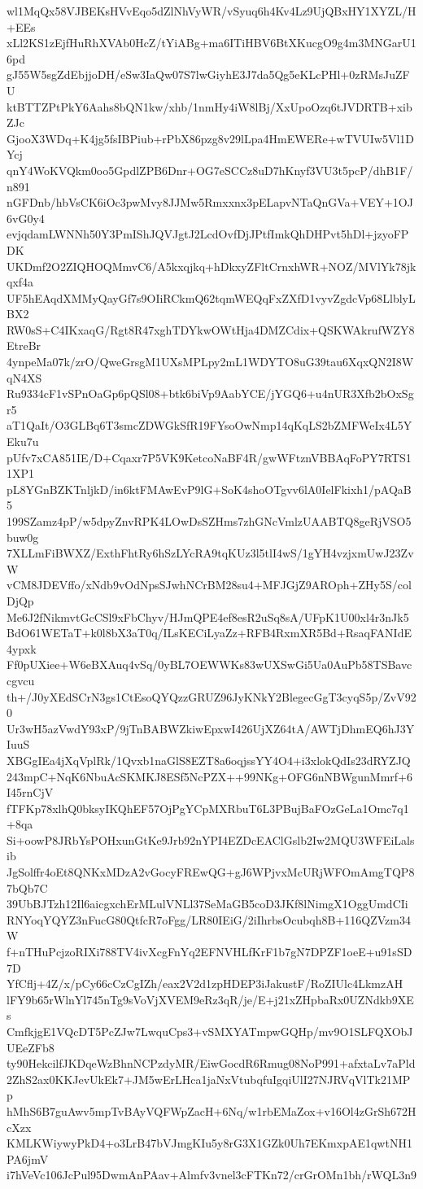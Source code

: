 wl1MqQx58VJBEKsHVvEqo5dZlNhVyWR/vSyuq6h4Kv4Lz9UjQBxHY1XYZL/H+EEs
xLl2KS1zEjfHuRhXVAb0HcZ/tYiABg+ma6ITiHBV6BtXKucgO9g4m3MNGarU16pd
gJ55W5sgZdEbjjoDH/eSw3IaQw07S7lwGiyhE3J7da5Qg5eKLcPHl+0zRMsJuZFU
ktBTTZPtPkY6Aahs8bQN1kw/xhb/1nmHy4iW8lBj/XxUpoOzq6tJVDRTB+xibZJc
GjooX3WDq+K4jg5fsIBPiub+rPbX86pzg8v29lLpa4HmEWERe+wTVUIw5Vl1DYcj
qnY4WoKVQkm0oo5GpdlZPB6Dnr+OG7eSCCz8uD7hKnyf3VU3t5pcP/dhB1F/n891
nGFDnb/hbVsCK6iOc3pwMvy8JJMw5Rmxxnx3pELapvNTaQnGVa+VEY+1OJ6vG0y4
evjqdamLWNNh50Y3PmIShJQVJgtJ2LcdOvfDjJPtfImkQhDHPvt5hDl+jzyoFPDK
UKDmf2O2ZIQHOQMmvC6/A5kxqjkq+hDkxyZFltCrnxhWR+NOZ/MVlYk78jkqxf4a
UF5hEAqdXMMyQayGf7s9OIiRCkmQ62tqmWEQqFxZXfD1vyvZgdcVp68LlblyLBX2
RW0sS+C4IKxaqG/Rgt8R47xghTDYkwOWtHja4DMZCdix+QSKWAkrufWZY8EtreBr
4ynpeMa07k/zrO/QweGrsgM1UXsMPLpy2mL1WDYTO8uG39tau6XqxQN2I8WqN4XS
Ru9334cF1vSPnOaGp6pQSl08+btk6biVp9AabYCE/jYGQ6+u4nUR3Xfb2bOxSgr5
aT1QaIt/O3GLBq6T3smcZDWGkSfR19FYsoOwNmp14qKqLS2bZMFWeIx4L5YEku7u
pUfv7xCA851IE/D+Cqaxr7P5VK9KetcoNaBF4R/gwWFtznVBBAqFoPY7RTS11XP1
pL8YGnBZKTnljkD/in6ktFMAwEvP9lG+SoK4shoOTgvv6lA0IelFkixh1/pAQaB5
199SZamz4pP/w5dpyZnvRPK4LOwDsSZHms7zhGNcVmlzUAABTQ8geRjVSO5buw0g
7XLLmFiBWXZ/ExthFhtRy6hSzLYcRA9tqKUz3l5tlI4wS/1gYH4vzjxmUwJ23ZvW
vCM8JDEVffo/xNdb9vOdNpsSJwhNCrBM28su4+MFJGjZ9AROph+ZHy5S/colDjQp
Me6J2fNikmvtGcCSl9xFbChyv/HJmQPE4ef8esR2uSq8sA/UFpK1U00xl4r3nJk5
BdO61WETaT+k0l8bX3aT0q/ILsKECiLyaZz+RFB4RxmXR5Bd+RsaqFANIdE4ypxk
Ff0pUXiee+W6eBXAuq4vSq/0yBL7OEWWKs83wUXSwGi5Ua0AuPb58TSBavccgvcu
th+/J0yXEdSCrN3gs1CtEsoQYQzzGRUZ96JyKNkY2BlegecGgT3cyqS5p/ZvV920
Ur3wH5azVwdY93xP/9jTnBABWZkiwEpxwI426UjXZ64tA/AWTjDhmEQ6hJ3YIuuS
XBGgIEa4jXqVplRk/1Qvxb1naGlS8EZT8a6oqjssYY4O4+i3xlokQdIs23dRYZJQ
243mpC+NqK6NbuAcSKMKJ8ESf5NcPZX++99NKg+OFG6nNBWgunMmrf+6I45rnCjV
fTFKp78xlhQ0bksyIKQhEF57OjPgYCpMXRbuT6L3PBujBaFOzGeLa1Omc7q1+8qa
Si+oowP8JRbYsPOHxunGtKe9Jrb92nYPI4EZDcEAClGslb2Iw2MQU3WFEiLalsib
JgSolffr4oEt8QNKxMDzA2vGocyFREwQG+gJ6WPjvxMcURjWFOmAmgTQP87bQb7C
39UbBJTzh12Il6aicgxchErMLulVNLl37SeMaGB5coD3JKf8lNimgX1OggUmdCIi
RNYoqYQYZ3nFucG80QtfcR7oFgg/LR80IEiG/2iIhrbsOcubqh8B+116QZVzm34W
f+nTHuPcjzoRIXi788TV4ivXcgFnYq2EFNVHLfKrF1b7gN7DPZF1oeE+u91sSD7D
YfCflj+4Z/x/pCy66cCzCgIZh/eax2V2d1zpHDEP3iJakustF/RoZIUlc4LkmzAH
lFY9b65rWlnYl745nTg9sVoVjXVEM9eRz3qR/je/E+j21xZHpbaRx0UZNdkb9XEs
CmfkjgE1VQcDT5PcZJw7LwquCps3+vSMXYATmpwGQHp/mv9O1SLFQXObJUEeZFb8
ty90HekcilfJKDqeWzBhnNCPzdyMR/EiwGocdR6Rmug08NoP991+afxtaLv7aPld
2ZhS2ax0KKJevUkEk7+JM5wErLHca1jaNxVtubqfuIgqiUlI27NJRVqVlTk21MPp
hMhS6B7guAwv5mpTvBAyVQFWpZacH+6Nq/w1rbEMaZox+v16Ol4zGrSh672HcXzx
KMLKWiywyPkD4+o3LrB47bVJmgKIu5y8rG3X1GZk0Uh7EKmxpAE1qwtNH1PA6jmV
i7hVeVc106JcPul95DwmAnPAav+Almfv3vnel3cFTKn72/crGrOMn1bh/rWQL3n9
